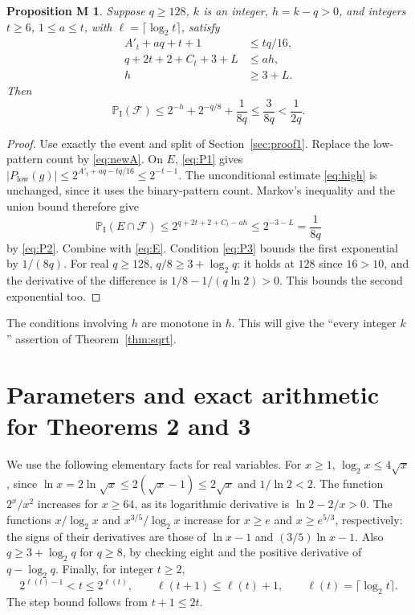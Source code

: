 \documentclass[11pt]{amsart}
\newtheorem*{propM}{Proposition M}
\theoremstyle{remark}
\newcommand{\PI}{\mathbb P_{\mathrm I}}
\newcommand{\Fail}{\mathcal F}
\newcommand{\lo}{P_{\mathrm{low}}}
\begin{document}
\begin{propM}
Suppose $q\ge128$, $k$ is an integer, $h=k-q>0$, and integers
$t\ge6$, $1\le a\le t$, with $\ell=\lceil\log_2t\rceil$, satisfy
\begin{align}
 A'_t+aq+t+1&\le tq/16, \tag{P1}\label{eq:P1}\\
 q+2t+2+C_t+3+L&\le ah, \tag{P2}\label{eq:P2}\\
 h&\ge3+L. \tag{P3}\label{eq:P3}
\end{align}
Then
\[
 \PI(\Fail)\le2^{-h}+2^{-q/8}+\frac1{8q}
 \le\frac3{8q}<\frac1{2q}.
\]
\end{propM}
\begin{proof}
Use exactly the event and split of Section~\ref{sec:proof1}.
Replace the low-pattern count by \eqref{eq:newA}. On $E$,
\eqref{eq:P1} gives $|\lo(g)|\le2^{A'_t+aq-tq/16}\le2^{-t-1}$.
The unconditional estimate \eqref{eq:high} is unchanged, since it
uses the binary-pattern count. Markov's inequality and the union
bound therefore give
\[
 \PI(E\cap\Fail)\le2^{q+2t+2+C_t-ah}\le2^{-3-L}=\frac1{8q}
\]
by \eqref{eq:P2}. Combine with \eqref{eq:E}. Condition
\eqref{eq:P3} bounds the first exponential by $1/(8q)$. For real
$q\ge128$, $q/8\ge3+\log_2q$: it holds at $128$ since $16>10$,
and the derivative of the difference is
$1/8-1/(q\ln2)>0$. This bounds the second exponential too.
\end{proof}

The conditions involving $h$ are monotone in $h$. This will give
the ``every integer $k$'' assertion of Theorem~\ref{thm:sqrt}.

\section{Parameters and exact arithmetic for Theorems 2 and 3}
\label{sec:parameters}
We use the following elementary facts for real variables. For $x\ge1$,
$\log_2x\le4\sqrt x$, since
$\ln x=2\ln\sqrt x\le2(\sqrt x-1)\le2\sqrt x$ and
$1/\ln2<2$. The function $2^x/x^2$ increases for $x\ge64$,
as its logarithmic derivative is $\ln2-2/x>0$. The functions
$x/\log_2x$ and $x^{3/5}/\log_2x$ increase for $x\ge e$ and
$x\ge e^{5/3}$, respectively: the signs of their derivatives are
those of $\ln x-1$ and $(3/5)\ln x-1$. Also
$q\ge3+\log_2q$ for $q\ge8$, by checking eight and the positive
derivative of $q-\log_2q$. Finally, for integer $t\ge2$,
\[
 2^{\ell(t)-1}<t\le2^{\ell(t)},\qquad
 \ell(t+1)\le\ell(t)+1,\qquad \ell(t)=\lceil\log_2t\rceil.
\]
The step bound follows from $t+1\le2t$.
\end{document}
